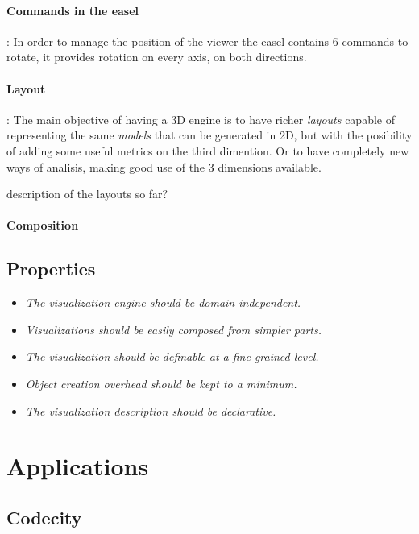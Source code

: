 \documentclass[runningheads]{llncs}
\newcommand{\seclabel}[1]{\label{sec:#1}}
\begin{document}
\paragraph{Commands in the easel}: 
In order to manage the position of the viewer the easel 
contains 6 commands to rotate, it provides rotation on 
every axis, on both directions.  

\paragraph{Layout}: %
The main objective of having a 3D engine is to have richer 
\emph{layouts} capable of representing the same \emph{models} 
that can be generated in 2D, but with the posibility of adding 
some useful metrics on the third dimention. Or to have 
completely new ways of analisis, making good use of the 3 
dimensions available.

description of the layouts so far?


\paragraph{Composition}

\subsection{Properties} \seclabel{properties}

\begin{itemize}
\item \emph{The visualization engine should be domain independent.}
\item \emph{Visualizations should be easily composed from simpler parts.}
\item \emph{The visualization should be definable at a fine grained level.}
\item \emph{Object creation overhead should be kept to a minimum.}
\item \emph{The visualization description should be declarative.}
\end{itemize}

\section{Applications} \seclabel{applications}

\subsection{Codecity}
\end{document}

